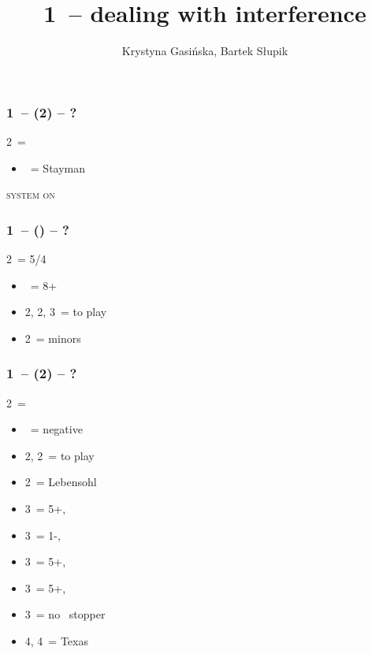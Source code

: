 \documentclass[12pt, a4paper]{article}
\title{1\ntx\ -- dealing with interference}
\author{Krystyna Gasińska, Bartek Słupik}
\begin{document}
\maketitle


\subsubsection*{1\ntx\ -- (2\clubs) -- ?}
2\clubs\ = \clubs
\begin{itemize}
    \item \dbl\ = Stayman
\end{itemize}

\textsc{system on}

\subsubsection*{1\ntx\ -- (\alrts{2\clubs}) -- ?}
2\clubs\ = 5/4 \major
\begin{itemize}
    \item \dbl\ = 8+
    \item 2\hearts, 2\spades, 3\clubs\ = to play
    \item 2\nt\ = minors
\end{itemize}

\subsubsection*{1\ntx\ -- (2\diams) -- ?}
2\diams\ = \diams
\begin{itemize}
    \item \dbl\ = negative
    \item 2\hearts, 2\spades\ = to play
    \item 2\nt\ = Lebensohl
    \item 3\clubs\ = 5+\hearts, \invp
    \item 3\diams\ = 1-\diams, \invp
    \item 3\hearts\ = 5+\spades, \invp
    \item 3\spades\ = 5+\clubs, \invp
    \item 3\nt\ = no \diams\ stopper
    \item 4\diams, 4\hearts\ = Texas
\end{itemize}
\end{document}
